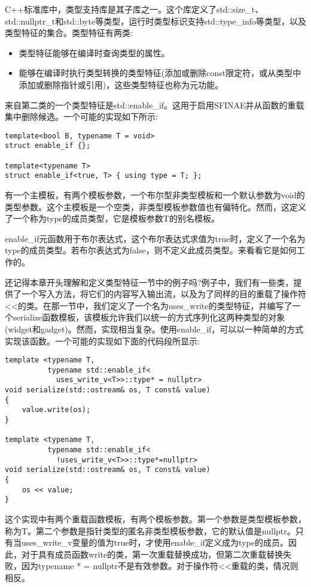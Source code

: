 C++标准库中，类型支持库是其子库之一。这个库定义了std::size\_t、std::nullptr\_t和std::byte等类型，运行时类型标识支持std::type\_info等类型，以及类型特征的集合。类型特征有两类:

\begin{itemize}
\item
类型特征能够在编译时查询类型的属性。

\item
能够在编译时执行类型转换的类型特征(添加或删除const限定符，或从类型中添加或删除指针或引用)，这些类型特征也称为元功能。
\end{itemize}

来自第二类的一个类型特征是std::enable\_if。这用于启用SFINAE并从函数的重载集中删除候选。一个可能的实现如下所示:

\begin{lstlisting}[style=styleCXX]
template<bool B, typename T = void>
struct enable_if {};

template<typename T>
struct enable_if<true, T> { using type = T; };
\end{lstlisting}

有一个主模板，有两个模板参数，一个布尔型非类型模板和一个默认参数为void的类型参数。这个主模板是一个空类，非类型模板参数值也有偏特化。然而，这定义了一个称为type的成员类型，它是模板参数T的别名模板。

enable\_if元函数用于布尔表达式，这个布尔表达式求值为true时，定义了一个名为type的成员类型。若布尔表达式为false，则不定义此成员类型。来看看它是如何工作的。

还记得本章开头理解和定义类型特征一节中的例子吗?例子中，我们有一些类，提供了一个写入方法，将它们的内容写入输出流，以及为了同样的目的重载了操作符<{}<的类。在那一节中，我们定义了一个名为uses\_write的类型特征，并编写了一个serialize函数模板，该模板允许我们以统一的方式序列化这两种类型的对象(widget和gadget)。然而，实现相当复杂。使用enable\_if，可以以一种简单的方式实现该函数。一个可能的实现如下面的代码段所显示:

\begin{lstlisting}[style=styleCXX]
template <typename T,
		  typename std::enable_if<
			uses_write_v<T>>::type* = nullptr>
void serialize(std::ostream& os, T const& value)
{
	value.write(os);
}

template <typename T,
		  typename std::enable_if<
			!uses_write_v<T>>::type*=nullptr>
void serialize(std::ostream& os, T const& value)
{
	os << value;
}
\end{lstlisting}

这个实现中有两个重载函数模板，有两个模板参数。第一个参数是类型模板参数，称为T。第二个参数是指针类型的匿名非类型模板参数，它的默认值是nullptr。只有当uses\_write\_v变量的值为true时，才使用enable\_if定义成为type的成员。因此，对于具有成员函数write的类，第一次重载替换成功，但第二次重载替换失败，因为typename * = nullptr不是有效参数。对于操作符<{}<重载的类，情况则相反。


